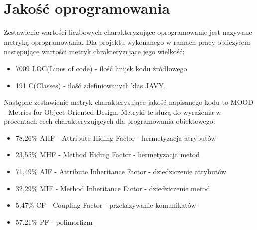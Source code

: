 
\section{Jakość oprogramowania}
\label{sec:jakoscOprogramowania}

Zestawienie wartości liczbowych charakteryzujące oprogramowanie jest nazywane metryką oprogramowania. Dla projektu wykonanego w ramach pracy obliczyłem następujące wartości metryk chrakteryzujące jego wielkość:
\begin{itemize}
 \item 7009 LOC(Lines of code) - ilość linijek kodu źródłowego
 \item 191 C(Classes) - ilość zdefiniowanych klas JAVY.
\end{itemize}

Następne zestawienie metryk charakteryzujące jakość napisanego kodu to MOOD - Metrics for Object-Oriented Design. Metryki te służą do wyrażenia w procentach cech charakteryzujących dla programowania obiektowego:
\begin{itemize}
 \item 78,26\% AHF - Attribute Hiding Factor - hermetyzacja atrybutów
 \item 23,55\% MHF - Method Hiding Factor - hermetyzacja metod
 \item 71,49\% AIF - Attribute Inheritance Factor - dziedziczenie atrybutów
 \item 32,29\% MIF - Method Inheritance Factor - dziedziczenie metod
 \item 5,47\% CF - Coupling Factor - przekazywanie komunikatów 
 \item 57,21\% PF - polimorfizm
\end{itemize}

